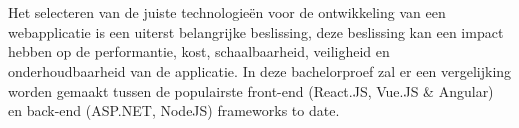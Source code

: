 
%
%
%
%
%

%


\chapter*{}
Het selecteren van de juiste technologieën voor de ontwikkeling van een
webapplicatie is een uiterst belangrijke beslissing, deze beslissing kan een
impact hebben op de performantie, kost, schaalbaarheid, veiligheid en
onderhoudbaarheid van de applicatie. In deze bachelorproef zal er een
vergelijking worden gemaakt tussen de populairste front-end (React.JS, Vue.JS \& Angular) en back-end (ASP.NET, NodeJS) frameworks to date.